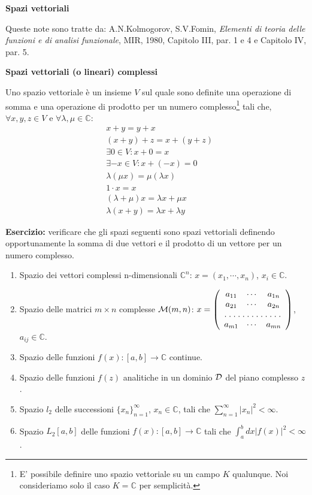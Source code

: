 \documentclass[a4paper,10pt]{article}
\newcommand{\linea}{\vskip14pt \noindent}
\begin{document}
\newpage

\centerline{\LARGE \bf Spazi vettoriali}

\linea
Queste note sono tratte da:
A.N.Kolmogorov, S.V.Fomin, {\it Elementi di teoria delle funzioni e di analisi funzionale},
MIR, 1980, Capitolo III, par. 1 e 4 e Capitolo IV, par. 5.

\linea
\centerline{\bf Spazi vettoriali (o lineari) complessi}

\linea
Uno spazio vettoriale \`e un insieme $V$ sul quale sono definite una operazione di somma e una
operazione di prodotto per un numero 
complesso\footnote{E' possibile definire uno spazio vettoriale su un campo $K$ qualunque.
Noi consideriamo solo il caso $K=\mathbb{C}$ per semplicit\`a.}
tali che, $\forall x,y,z \in V$ e 
$\forall \lambda, \mu \in \mathbb{C}$:
\begin{eqnarray}
&x+y=y+x \\
&(x+y)+z=x+(y+z) \\
&\exists 0 \in V : x + 0 = x \\
&\exists -x \in V : x + (-x) = 0 \\
&\lambda (\mu x) = \mu (\lambda x) \\
&1 \cdot x = x \\
&(\lambda+ \mu) x = \lambda x + \mu x\\
&\lambda(x+y) = \lambda x + \lambda y
\end{eqnarray}

\linea
{\bf Esercizio:} verificare che gli spazi seguenti sono spazi vettoriali definendo opportunamente
la somma di due vettori e il prodotto di un vettore per un numero complesso.

\begin{enumerate}
\item Spazio dei vettori complessi n-dimensionali $\mathbb{C}^n$: $x=(x_1,\cdots,x_n)$, $x_i \in \mathbb{C}$.
\item Spazio delle matrici $m \times n$ complesse ${\cal M}(m,n)$: $x = \left(
\begin{array}{ccc}
a_{11} & \cdots & a_{1n} \\
a_{21} & \cdots & a_{2n} \\
\hdotsfor[1.5]{3} \\
a_{m1} & \cdots & a_{mn} \\
\end{array}
\right)$, $a_{ij} \in \mathbb{C}$.
\item Spazio delle funzioni $f(x):[a,b] \rightarrow \mathbb{C}$ continue.
\item Spazio delle funzioni $f(z)$ analitiche in un dominio ${\cal D}$ del piano complesso $z$.
\item Spazio $l_2$ delle successioni $\{x_n\}_{n=1}^\infty$, $x_n \in \mathbb{C}$, tali che
$\sum_{n=1}^\infty |x_n|^2 <\infty$.
\item Spazio $L_2[a,b]$ delle funzioni $f(x):[a,b] \rightarrow \mathbb{C}$ tali che
$\int_a^b dx |f(x)|^2 < \infty$.
\end{enumerate}
\end{document}
